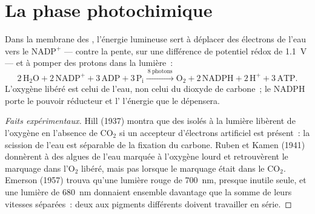 \section{La phase photochimique}

\begin{proposition}\label{prop:b1:photosynthesis:lightreactions}
Dans la membrane des , l'énergie lumineuse sert à déplacer
des électrons de l'eau vers le $\mathrm{NADP^+}$ --- contre la pente,
sur une différence de potentiel rédox de \qty{1.1}{V} --- et à pomper
des protons dans la lumière~:
\[
2\,\mathrm{H_2O} + 2\,\mathrm{NADP^+} + 3\,\mathrm{ADP} + 3\,\mathrm{P_i}
\xrightarrow{\ 8\ \text{photons}\ }
\mathrm{O_2} + 2\,\mathrm{NADPH} + 2\,\mathrm{H^+} + 3\,\mathrm{ATP} .
\]
L'oxygène libéré est celui de l'eau, non celui du dioxyde de carbone~;
le NADPH porte le pouvoir réducteur et l' l'énergie que le  dépensera.
\end{proposition}
\begin{proof}[Faits expérimentaux]
Hill (1937) montra que des  isolés à la lumière libèrent de
l'oxygène en l'absence de $\mathrm{CO_2}$ si un accepteur d'électrons
artificiel est présent~: la scission de l'eau est séparable de la
fixation du carbone. Ruben et Kamen (1941) donnèrent à des algues de
l'eau marquée à l'oxygène lourd et retrouvèrent le marquage dans
l'$\mathrm{O_2}$ libéré, mais pas lorsque le marquage était dans le
$\mathrm{CO_2}$. Emerson (1957) trouva qu'une lumière rouge de
\qty{700}{nm}, presque inutile seule, et une lumière de \qty{680}{nm}
donnaient ensemble davantage que la somme de leurs vitesses séparées~:
deux  aux pigments différents doivent travailler en série.
\end{proof}

